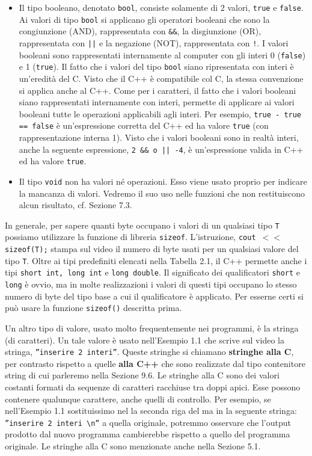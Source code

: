 \documentclass[a4paper,12pt]{book}
\begin{document}
\begin{itemize}
\item
Il tipo booleano, denotato \texttt{bool}, consiste solamente di 2 valori, \texttt{true} e \texttt{false}.
Ai valori di tipo \texttt{bool} si applicano gli operatori booleani che sono la congiunzione (AND), rappresentata con \texttt{\&\&}, la disgiunzione (OR), rappresentata con \texttt{||} e la negazione (NOT), rappresentata con \texttt{!}.
I valori booleani sono rappresentati internamente al computer con gli interi 0 (\texttt{false}) e 1 (\texttt{true}). 
Il fatto che i valori del tipo \texttt{bool} siano ripresentata con interi è un'eredità del C.
Visto che il C++ è compatibile col C, la stessa convenzione si applica anche al C++.
Come per i caratteri, il fatto che i valori booleani siano rappresentati internamente con interi, permette di applicare ai valori booleani tutte le operazioni applicabili agli interi.
Per esempio, \texttt{true - true == false} è un'espressione corretta del C++ ed ha valore \texttt{true} (con rappresentazione interna 1).
Visto che i valori booleani sono in realtà interi, anche la seguente espressione, \texttt{2 \&\& o \texttt{||} -4}, è un'espressione valida in C++ ed ha valore \texttt{true}.

\item
Il tipo \texttt{void} non ha valori né operazioni.
Esso viene usato proprio per indicare la mancanza di valori.
Vedremo il suo uso nelle funzioni che non restituiscono alcun risultato, cf. Sezione 7.3.

\end{itemize}

In generale, per sapere quanti byte occupano i valori di un qualsiasi tipo \texttt{T} possiamo utilizzare la funzione di libreria \texttt{sizeof}.
L'istruzione, \texttt{cout $<<$ sizeof(T);} stampa sul video il numero di byte usati per un qualsiasi valore del tipo \texttt{T}.
Oltre ai tipi predefiniti elencati nella Tabella 2.1, il C++ permette anche i tipi \texttt{short int, long int} e \texttt{long double}.
Il significato dei qualificatori \texttt{short} e \texttt{long} è ovvio, ma in molte realizzazioni i valori di questi tipi occupano lo stesso numero di byte del tipo base a cui il qualificatore è applicato.
Per esserne certi si può usare la funzione \texttt{sizeof()} descritta prima. 

Un altro tipo di valore, usato molto frequentemente nei programmi, è la stringa (di caratteri). Un tale valore è usato nell'Esempio 1.1 che scrive sul video la stringa, \texttt{''inserire 2 interi''}.
Queste stringhe si chiamano \textbf{stringhe alla C}, per contrasto rispetto a quelle \textbf{alla C++} che sono realizzate dal tipo contenitore string di cui parleremo nella Sezione 9.6.
Le stringhe alla C sono dei valori costanti formati da sequenze di caratteri racchiuse tra doppi apici.
Esse possono contenere qualunque carattere, anche quelli di controllo.
Per esempio, se nell'Esempio 1.1 sostituissimo nel la seconda riga del ma in la seguente stringa: \texttt{''inserire 2 interi \textbackslash n''} a quella originale, potremmo osservare che l'output prodotto dal nuovo programma cambierebbe rispetto a quello del programma originale.
Le stringhe alla C sono menzionate anche nella Sezione 5.1. 
\end{document}
